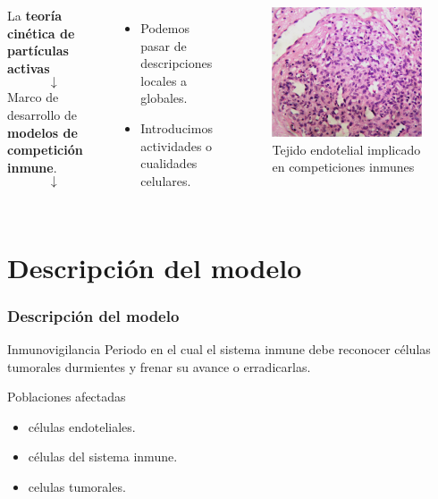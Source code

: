 \documentclass{beamer}
\begin{document}
\begin{frame}
	  \begin{columns}[t]
	  
	  	
	  	La\textbf{ teoría cinética de partículas activas}
	  	$$\downarrow$$
	  	  Marco de desarrollo de \textbf{modelos de competición inmune}.
	  	$$\downarrow$$
	  	\begin{itemize}
	  		\item Podemos pasar de descripciones locales a globales.
	  		\item Introducimos actividades o cualidades celulares.
	  	\end{itemize}
	  		\begin{figure}[Celulas endoteliales]
	  			\includegraphics[scale=1]{intro.png}
	  			\caption{Tejido endotelial implicado en competiciones inmunes}
	  			\label{tejido}
	  		\end{figure}
\end{columns}
\end{frame}


\section{Descripción del modelo}

\begin{frame}
  \frametitle{Descripción del modelo}
  \begin{block}{Inmunovigilancia}
    Periodo en el cual el sistema inmune debe reconocer células tumorales durmientes y frenar su avance o erradicarlas.
  \end{block}
 \begin{block}{Poblaciones afectadas}
 	\begin{itemize}
 		\item células endoteliales.
 		\item células del sistema inmune.
 		\item celulas tumorales.
 	\end{itemize}
 \end{block}
\end{frame}
\end{document}
